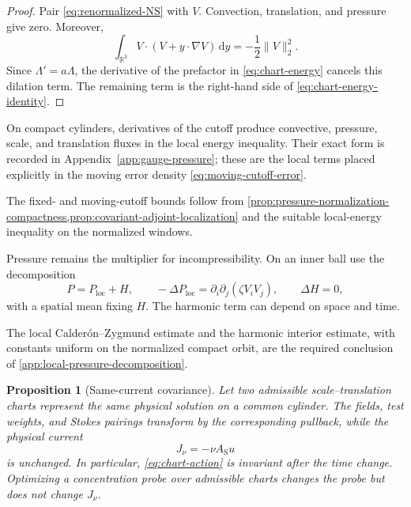\documentclass[11pt]{amsart}
\numberwithin{equation}{section}
\theoremstyle{plain}
\newtheorem{proposition}[proposition]{Proposition}
\theoremstyle{definition}
\theoremstyle{remark}
\newcommand{\R}{\mathbb R}
\newcommand{\dd}{\,\mathrm d}
\begin{document}
\begin{proof}
Pair \eqref{eq:renormalized-NS} with \(V\).  Convection, translation, and
pressure give zero.  Moreover,
\[
 \int_{\R^3}V\cdot(V+y\cdot\nabla V)\dd y
 =-\frac12\|V\|_2^2.
\]
Since \(\Lambda'=a\Lambda\), the derivative of the prefactor in
\eqref{eq:chart-energy} cancels this dilation term.  The remaining term is
the right-hand side of \eqref{eq:chart-energy-identity}.
\end{proof}

On compact cylinders, derivatives of the cutoff produce convective, pressure,
scale, and translation fluxes in the local energy inequality.  Their exact
form is recorded in Appendix~\ref{app:gauge-pressure}; these are the local
terms placed explicitly in the moving error density
\eqref{eq:moving-cutoff-error}.

The fixed- and moving-cutoff bounds follow from
\cref{prop:pressure-normalization-compactness,prop:covariant-adjoint-localization}
and the suitable local-energy inequality on the normalized windows.

Pressure remains the multiplier for incompressibility.  On an inner ball use
the decomposition
\begin{equation}\label{eq:pressure-decomposition}
 P=P_{\mathrm{loc}}+H,
 \qquad
 -\Delta P_{\mathrm{loc}}
 =\partial_i\partial_j(\zeta V_iV_j),
 \qquad \Delta H=0,
\end{equation}
with a spatial mean fixing \(H\).  The harmonic term can depend on space and
time.

The local Calder\'on--Zygmund estimate and the harmonic interior estimate,
with constants uniform on the normalized compact orbit, are the required
conclusion of \cref{app:local-pressure-decomposition}.

\begin{proposition}[Same-current covariance]
\label{prop:same-current-covariance}
Let two admissible scale--translation charts represent the same physical
solution on a common cylinder.  The fields, test weights, and Stokes pairings
transform by the corresponding pullback, while the physical current
\begin{equation}\label{eq:fixed-current}
 J_\nu=-\nu A_{\mathrm S}u
\end{equation}
is unchanged.  In particular, \eqref{eq:chart-action} is invariant after the
time change.  Optimizing a concentration probe over admissible charts changes
the probe but does not change \(J_\nu\).
\end{proposition}
\end{document}
